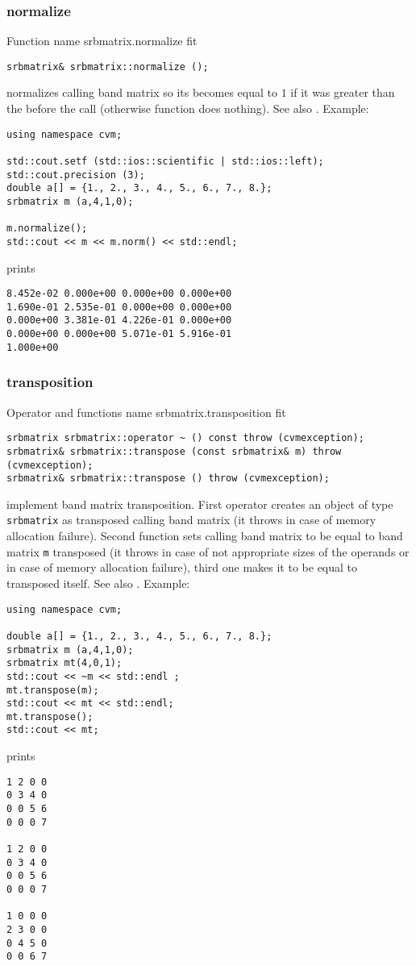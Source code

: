 \subsubsection{normalize}
Function%
\pdfdest name {srbmatrix.normalize} fit
\begin{verbatim}
srbmatrix& srbmatrix::normalize ();
\end{verbatim}
normalizes  calling band matrix so its 
becomes equal to $1$ if it was greater than the 
before the call (otherwise function does nothing).
See also .
Example:
\begin{Verbatim}
using namespace cvm;

std::cout.setf (std::ios::scientific | std::ios::left); 
std::cout.precision (3);
double a[] = {1., 2., 3., 4., 5., 6., 7., 8.};
srbmatrix m (a,4,1,0);

m.normalize();
std::cout << m << m.norm() << std::endl;
\end{Verbatim}
prints
\begin{Verbatim}
8.452e-02 0.000e+00 0.000e+00 0.000e+00
1.690e-01 2.535e-01 0.000e+00 0.000e+00
0.000e+00 3.381e-01 4.226e-01 0.000e+00
0.000e+00 0.000e+00 5.071e-01 5.916e-01
1.000e+00
\end{Verbatim}
\newpage


\subsubsection{transposition}
Operator and functions%
\pdfdest name {srbmatrix.transposition} fit
\begin{verbatim}
srbmatrix srbmatrix::operator ~ () const throw (cvmexception);
srbmatrix& srbmatrix::transpose (const srbmatrix& m) throw (cvmexception);
srbmatrix& srbmatrix::transpose () throw (cvmexception);
\end{verbatim}
implement band matrix transposition.
First operator creates an object of type \verb"srbmatrix" as
 transposed calling band matrix
(it throws  
in case of memory allocation failure). 
Second function sets calling band matrix to be 
equal to  band matrix
\verb"m" transposed
(it throws  
in case of not appropriate sizes of the operands or
in case of memory allocation failure), 
third one makes it to be equal to
transposed itself. 
See also .
Example:
\begin{Verbatim}
using namespace cvm;

double a[] = {1., 2., 3., 4., 5., 6., 7., 8.};
srbmatrix m (a,4,1,0);
srbmatrix mt(4,0,1);
std::cout << ~m << std::endl ;
mt.transpose(m);
std::cout << mt << std::endl;
mt.transpose();
std::cout << mt;
\end{Verbatim}
prints
\begin{Verbatim}
1 2 0 0
0 3 4 0
0 0 5 6
0 0 0 7

1 2 0 0
0 3 4 0
0 0 5 6
0 0 0 7

1 0 0 0
2 3 0 0
0 4 5 0
0 0 6 7
\end{Verbatim}
\newpage




